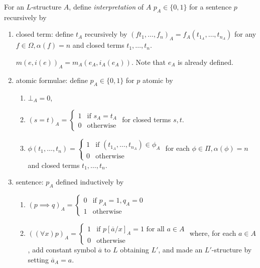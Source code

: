 \documentclass[a4paper]{article}
\begin{document}
\begin{definition}[Interpretation]
  For an \(L\)-structure \(A\), define \emph{interpretation} of \(A\) \(p_A \in \{0, 1\}\) for a sentence \(p\) recursively by
  \begin{enumerate}
  \item closed term: define \(t_A\) recursively by \((ft_1, \dots, f_n)_A = f_A(t_{1_A}, \dots, t_{n_A})\) for any \(f \in \Omega, \alpha(f) = n\) and closed terms \(t_1, \dots, t_n\).
    \begin{eg}
      \(m(e, i(e))_A = m_A(e_A, i_A(e_A))\). Note that \(e_A\) is already defined.
    \end{eg}
  \item atomic formulae: define \(p_A \in \{0, 1\}\) for \(p\) atomic by
    \begin{enumerate}
    \item \(\bot_A = 0\),
    \item \((s = t)_A = \begin{cases} 1 & \text{if } s_A = t_A \\ 0 & \text{otherwise} \end{cases}\) for closed terms \(s, t\).
    \item \(\phi(t_1, \dots, t_n) = \begin{cases} 1 & \text{if } (t_{1_A}, \dots, t_{n_A}) \in \phi_A \\ 0 & \text{otherwise} \end{cases}\) for each \(\phi \in \Pi, \alpha(\phi) = n\) and closed terms \(t_1, \dots, t_n\).
    \end{enumerate}
  \item sentence: \(p_A\) defined inductively by
    \begin{enumerate}
    \item \((p \implies q)_A = \begin{cases} 0 & \text{if } p_A = 1, q_A = 0 \\ 1 & \text{otherwise} \end{cases}\)
    \item \(((\forall x) p)_A = \begin{cases} 1 & \text{if } p[\overline a/x]_A = 1 \text{ for all } a \in A \\ 0 & \text{otherwise} \end{cases}\) where, for each \(a \in A\), add constant symbol \(\overline a\) to \(L\) obtaining \(L'\), and made an \(L'\)-structure by setting \(\overline a_A = a\).
    \end{enumerate}
  \end{enumerate}
\end{definition}
\end{document}
